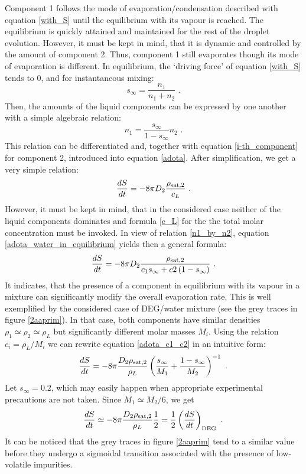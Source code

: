 \documentclass[twoside,twocolumn,9pt]{article}
\begin{document}
Component 1 follows the mode of evaporation/condensation described with equation \ref{with_S} until the equilibrium with its vapour is reached. The equilibrium is quickly attained and maintained for the rest of the droplet evolution. However, it must be kept in mind, that it is dynamic and controlled by the amount of component 2. Thus, component 1 still evaporates though its mode of evaporation is different. In equilibrium, the `driving force' of equation \ref{with_S} tends to 0, and for instantaneous mixing:
\begin{equation}
s_{\infty} = \frac{n_1}{n_1+n_2} \mbox{~.}
\end{equation}
Then, the amounts of the liquid components can be expressed by one another with a simple algebraic relation:
\begin{equation}
n_1 = \frac{s_{\infty}}{1-s_{\infty}} n_2 \mbox{~.}
\label{n1_by_n2}
\end{equation}
This relation can be differentiated and, together with equation \ref{i-th_component} for component 2, introduced into equation \ref{adota}. After simplification, we get a very simple relation:
\begin{equation}
\frac{dS}{dt} = -8\pi D_2 \frac{\rho_{{\rm sat},2}}{c_L}  \mbox{~.}
\label{adota_water_in_equilibrium}
\end{equation}
However, it must be kept in mind, that in the considered case neither of the liquid components dominates and formula \ref{c_L} for the the total molar concentration must be invoked. In view of relation \ref{n1_by_n2}, equation \ref{adota_water_in_equilibrium} yields then a general formula:
\begin{equation}
\frac{dS}{dt} = -8\pi D_2 \frac{\rho_{{\rm sat},2}}{c_1 s_\infty + c2 \left(1-s_\infty \right)}  \mbox{~.}
\label{adota_c1_c2}
\end{equation}
It indicates, that the presence of a component in equilibrium with its vapour in a mixture can significantly modify the overall evaporation rate.
This is well exemplified by the considered case of DEG/water mixture (see the grey traces in figure \ref{2aaprim}). In that case, both components have similar densities $\rho_1\simeq\rho_2\simeq \rho_L$ but significantly different molar masses $M_i$. Using the relation $c_i=\rho_L/M_i$ we can rewrite equation \ref{adota_c1_c2} in an intuitive form:
\begin{equation}
\frac{dS}{dt} = -8\pi \frac{D_2 \rho_{{\rm sat},2}}{\rho_L}\left(\frac{s_\infty}{M_1} + \frac{1-s_\infty}{M_2} \right)^{-1}  \mbox{~.}
\label{adota_M1_M2}
\end{equation}
Let $s_\infty=0.2$, which may easily happen when appropriate experimental precautions are not taken. Since $M_1\simeq M_2/6$, we get
\begin{equation}
\frac{dS}{dt} \simeq -8\pi \frac{D_2 \rho_{{\rm sat},2}}{\rho_L}\frac{1}{2} = \frac{1}{2} \left( \frac{dS}{dt} \right)_{\rm \small DEG} \mbox{~.}
\label{adota_estimation}
\end{equation}
It can be noticed that the grey traces in figure \ref{2aaprim} tend to a similar value before they undergo a sigmoidal transition associated with the presence of low-volatile impurities. 
\end{document}
